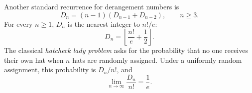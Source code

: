 \documentclass[11pt,oneside]{article}
\begin{document}
\begin{remark}
Another standard recurrence for derangement numbers is
\[
    D_n=(n-1)(D_{n-1}+D_{n-2}),
    \qquad n\geq3.
\]
For every $n\geq1$, $D_n$ is the nearest integer to $n!/e$:
\[
    D_n=\left\lfloor\frac{n!}{e}+\frac12\right\rfloor.
\]
The classical \emph{hatcheck lady problem} asks for the probability that no one receives their own hat when $n$ hats are randomly assigned. Under a uniformly random assignment, this probability is $D_n/n!$, and
\[
    \lim_{n\to\infty}\frac{D_n}{n!}=\frac{1}{e}.
\]
\end{remark}
\end{document}
